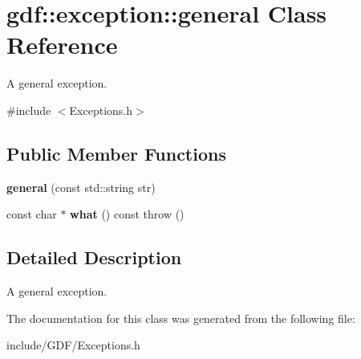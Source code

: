 \hypertarget{classgdf_1_1exception_1_1general}{
\section{gdf::exception::general Class Reference}
\label{classgdf_1_1exception_1_1general}
}


A general exception.  




{\ttfamily \#include $<$Exceptions.h$>$}

\subsection*{Public Member Functions}
\begin{DoxyCompactItemize}
\item 
\hypertarget{classgdf_1_1exception_1_1general_af54cd67a3c4dd8808176ea58567ddd0c}{
{\bfseries general} (const std::string str)}
\label{classgdf_1_1exception_1_1general_af54cd67a3c4dd8808176ea58567ddd0c}

\item 
\hypertarget{classgdf_1_1exception_1_1general_afcf154332d052569220eec9289d99604}{
const char $\ast$ {\bfseries what} () const   throw ()}
\label{classgdf_1_1exception_1_1general_afcf154332d052569220eec9289d99604}

\end{DoxyCompactItemize}


\subsection{Detailed Description}
A general exception. 

The documentation for this class was generated from the following file:\begin{DoxyCompactItemize}
\item 
include/GDF/Exceptions.h\end{DoxyCompactItemize}
